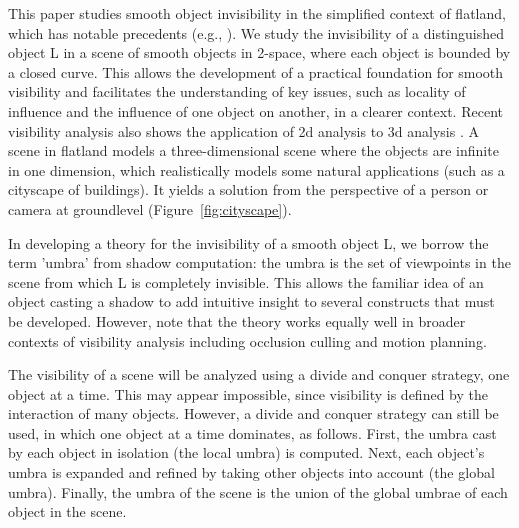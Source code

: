 \documentclass[9pt,twocolumn]{article}
\begin{document}
This paper studies smooth object invisibility in the simplified context of flatland,
which has notable precedents (e.g., \cite{heckbert92a}).
We study the invisibility of a distinguished object L in a scene of smooth objects in
2-space, where each object is bounded by a closed curve.
This allows the development of a practical foundation for smooth visibility
and facilitates the understanding of key issues, such as locality of influence and
the influence of one object on another, in a clearer context.
Recent visibility analysis also shows the
application of 2d analysis to 3d analysis \cite{leyvand03}.
%
%
A scene in flatland models a three-dimensional scene where
the objects are infinite in one dimension,
which realistically models some natural applications (such as a cityscape of buildings).
It yields a solution from the perspective of a person or camera at groundlevel
(Figure~\ref{fig:cityscape}).

In developing a theory for the invisibility of a smooth object L,
we borrow the term 'umbra' from shadow computation:
the umbra
is the set of viewpoints in the scene from which L is completely invisible.
This allows the familiar idea of an object casting a shadow to
add intuitive insight to several constructs that must be developed.
However, note that the theory works equally well in
broader contexts of visibility analysis including
occlusion culling and motion planning.

The visibility of a scene will be analyzed using a divide and conquer strategy,
one object at a time.
This may appear impossible, since visibility is defined by the 
interaction of many objects.
However, a divide and conquer strategy can still be used, in which one object at a time
dominates, as follows.
First, the umbra cast by each object in isolation (the local umbra) is computed.
Next, each object's umbra is expanded and refined 
by taking other objects into account (the global umbra).
Finally, the umbra of the scene is the union of the global umbrae
of each object in the scene.
\end{document}
